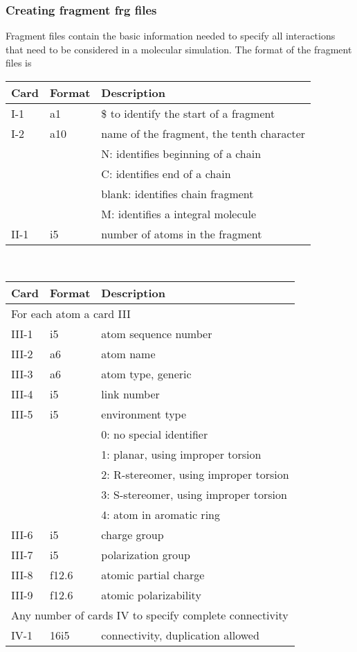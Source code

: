 \subsubsection{Creating fragment {\bf frg} files}
Fragment files contain the basic information needed to specify all
interactions that need to be considered in a molecular simulation.
The format of the fragment files is
\begin{center}
\begin{tabular}{lll}
\hline\hline
Card & Format & Description \\ \hline
I-1  & a1     & \$ to identify the start of a fragment \\
I-2  & a10    & name of the fragment, the tenth character\\
     &        & N: identifies beginning of a chain\\
     &        & C: identifies end of a chain\\
     &        & blank: identifies chain fragment\\
     &        & M: identifies a integral molecule\\
II-1 & i5     & number of atoms in the fragment\\ 
\hline
\end{tabular}\\
\begin{tabular}{lll}
\hline\hline
Card & Format & Description \\ \hline
\multicolumn{3}{l}{For each atom a card III} \\
III-1 & i5     & atom sequence number \\
III-2 & a6     & atom name \\
III-3 & a6     & atom type, generic \\
III-4 & i5     & link number\\
III-5 & i5     & environment type\\
      &        & 0: no special identifier\\
      &        & 1: planar, using improper torsion\\
      &        & 2: R-stereomer, using improper torsion\\
      &        & 3: S-stereomer, using improper torsion\\
      &        & 4: atom in aromatic ring\\
III-6 & i5     & charge group\\
III-7 & i5     & polarization group\\
III-8 & f12.6  & atomic partial charge\\
III-9 & f12.6  & atomic polarizability\\
\multicolumn{3}{l}{Any number of cards IV to specify complete 
connectivity} \\
IV-1  & 16i5   & connectivity, duplication allowed\\ 
\hline\hline
\end{tabular}
\end{center}
